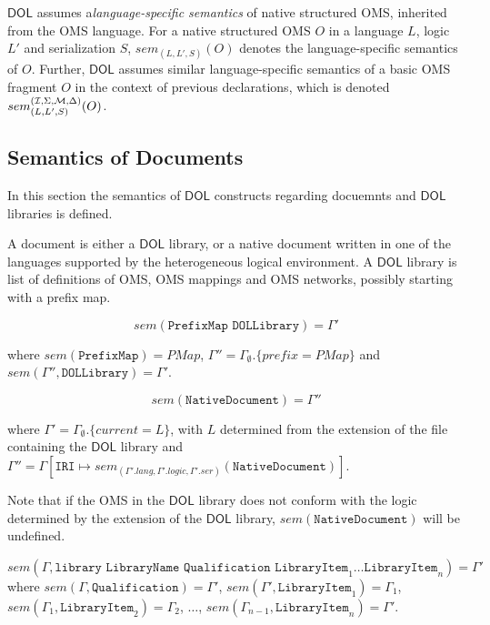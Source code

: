\documentclass[10pt,fleqn,final]{scrreprt}
\newcommand{\cbs}[0]{\color{red}\xspace} %
\newcommand{\cbe}[0]{\color{black}\xspace} %
\newcommand*{\syntax}[1]{\texttt{#1}}
\newcommand{\semdom}[1]{
\begin{center}
\fbox{$#1$}
\end{center}
}
\newcommand*{\DOL}{\ensuremath{\mathsf{DOL}}\xspace}
\newcommand{\prefix}{\mathit{prefix}}
\newcommand{\current}{\mathit{current}}
\newcommand{\PMap}{\mathit{PMap}}
\newcommand{\ssclause}[1]{\subsection{#1}}
\newenvironment{definitions}[0]{\medskip }{}
\begin{document}
\begin{definitions}

\cbs \DOL assumes a\cbe \emph{language-specific semantics} of native structured
OMS, inherited from the OMS language. For a native structured OMS $O$ 
in a language $L$, logic $L'$ and serialization $S$,\cbs 
$sem_{(L,L',S)}(O)$ denotes the language-specific semantics of $O$.
Further, \DOL assumes similar language-specific semantics of a basic OMS fragment $O$ in
the context of previous declarations, which is denoted 
$sem^{({\cal I},\Sigma,{\cal M},\Delta)}_{(L,L',S)}(O)$.\cbe

\ssclause{Semantics of Documents}
\cbs In this section the semantics of \DOL constructs regarding docuemnts and \DOL libraries is defined.\cbe 

\semdom{ sem(\syntax{Document}) = \Gamma}

\cbs A document is either a \DOL library, or a native document written
in one of the languages supported by the heterogeneous logical
environment.  A \DOL library is list of definitions of OMS, OMS
mappings and OMS networks, possibly starting with a prefix map.
\cbe

$$sem(\syntax{PrefixMap DOLLibrary}) = \Gamma'$$
 
\noindent where 
 $sem(\syntax{PrefixMap}) = \PMap$, $\Gamma'' = \Gamma_\emptyset.\{\prefix = \PMap\}$ and 
$sem(\Gamma'', \syntax{DOLLibrary}) = \Gamma'$. 

$$sem(\syntax{NativeDocument}) = \Gamma''$$

\noindent where 
$\Gamma' =\Gamma_\emptyset.\{\current = L\} $, with $L$ determined from the extension of the file containing the \DOL library
and 
$\Gamma'' = \Gamma[\syntax{IRI} \mapsto sem_{(\Gamma'.lang, \Gamma'.logic, \Gamma'.ser)}(\syntax{NativeDocument})]$.

Note that if the OMS in the \DOL library does not conform with the logic determined by
the extension of the \DOL library, $sem(\syntax{NativeDocument})$ will be undefined.


\semdom{sem(\Gamma, \syntax{DOLLibrary})= \Gamma'}

$sem(\Gamma, \syntax{library LibraryName Qualification LibraryItem}_1 \ldots \syntax{LibraryItem}_n)= \Gamma'$\\
\noindent where  $sem(\Gamma, \syntax{Qualification}) = \Gamma'$, $sem(\Gamma', \syntax{LibraryItem}_1) = \Gamma_1$,\\
  $sem(\Gamma_1,  \syntax{LibraryItem}_2) = \Gamma_2$, $\ldots$,  $sem(\Gamma_{n-1}, \syntax{LibraryItem}_n) = \Gamma'$.


\end{definitions}
\end{document}
